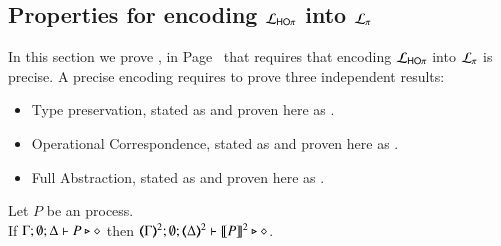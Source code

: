 

\subsection{Properties for encoding $\mathcal{L}_{\mathsf{HO}\pi}$ into $\mathcal{L}_{\pi}$}
\label{app:enc:HOp_to_sessp}

In this section we prove , in Page~\pageref{f:enc:hotopi}
that requires that encoding
$\mathcal{L}_{\mathsf{HO}\pi}$ into $\mathcal{L}_{\pi}$ is precise.
A precise encoding requires to prove three independent results:
\begin{itemize}
	\item	Type preservation, stated as  and proven here as
	.
	\item	Operational Correspondence, stated as  
	and proven here as .
	\item	Full Abstraction, stated as  and proven here 
	as .
\end{itemize}


\begin{proposition}\rm
	\label{app:prop:typepres_HOp_to_p}
	Let $P$ be an \HOp process. \\
	If $\Gamma; \emptyset; \Delta \vdash P \triangleright \diamond$ then 
	$\mapt{\Gamma}^{2}; \emptyset; \mapt{\Delta}^{2} \proves \map{P}^{2} \hastype \Proc$.
\end{proposition}



